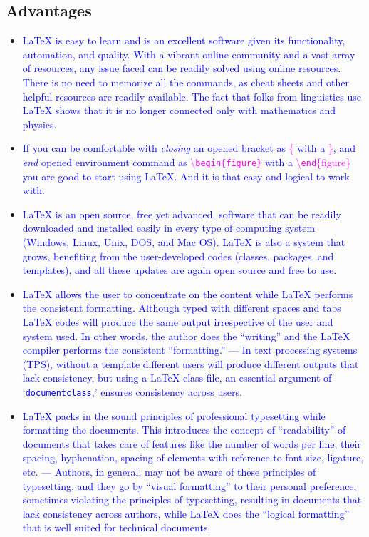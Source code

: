 \documentclass[phd,showframe]{ndsu-thesis-2022}
\newcommand\italk[1]{\textcolor{blue}{#1}}  %
\newcommand\cmd[1]{\textbackslash\texttt{#1}}  %
\newcommand\lx{\LaTeX\xspace}
\newcommand\vb[1]{\textcolor{blue}{\texttt{#1}}}%
\begin{document}
\subsection{Advantages}
\begin{itemize}[leftmargin=*, itemsep=0pt, parsep=3pt] 

\item \italk{\lx is easy to learn and is an excellent software given its functionality, automation, and quality. With a vibrant online community and a vast array of resources, any issue faced can be readily solved using online resources. There is no need to memorize all the commands, as cheat sheets and other helpful resources are readily available. The fact that folks from linguistics use \lx shows that it is no longer connected only with mathematics and physics.} 

\item \italk{ If you can be comfortable with \emph{closing} an opened bracket as \textcolor{magenta}{\{} with a \textcolor{magenta}{\}}, and \emph{end} opened environment command as \textcolor{magenta}{\cmd{begin\{figure\}}} with a  \textcolor{magenta}{\cmd{end}\{figure\}} you are good to start using \lx. And it is that easy and logical to work with.}

\item \italk{\lx is an open source, free yet advanced, software that can be readily downloaded and installed easily in every type of computing system (Windows, Linux, Unix, DOS, and Mac OS). \lx is also a system that grows, benefiting from the user-developed codes (classes, packages, and templates), and all these updates are again open source and free to use.}  

\item \italk{\lx allows the user to concentrate on the content while \lx performs the consistent formatting. Although typed with different spaces and tabs \lx codes will produce the same output irrespective of the user and system used. In other words, the author does the ``writing'' and the \lx compiler performs the consistent ``formatting.'' --- In text processing systems (TPS), without a template different users will produce different outputs that lack consistency, but using a \lx class file, an essential argument of `\vb{documentclass},' ensures consistency across users.}  

\item \italk{\lx packs in the sound principles of professional typesetting while formatting the documents. This introduces the concept of ``readability'' of documents that takes care of features like the number of words per line, their spacing, hyphenation, spacing of elements with reference to font size, ligature, etc. --- Authors, in general, may not be aware of these principles of typesetting, and they go by ``visual formatting'' to their personal preference, sometimes violating the principles of typesetting, resulting in documents that lack consistency across authors, while \lx does the ``logical formatting'' that is well suited for technical documents.} 


\end{itemize}
\end{document}
